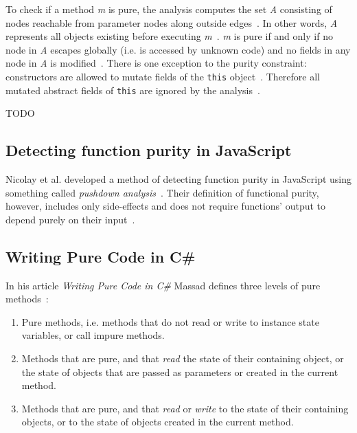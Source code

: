\documentclass[a4paper,12pt]{article}
\begin{document}
To check if a method \textit{m} is pure, the analysis computes the set \textit{A} consisting of nodes reachable from parameter nodes along outside edges~\cite{salcianu}. In other words, \textit{A} represents all objects existing before executing \textit{m}~\cite{salcianu}. \textit{m} is pure if and only if no node in \textit{A} escapes globally (i.e. is accessed by unknown code) and no fields in any node in \textit{A} is modified~\cite{salcianu}. There is one exception to the purity constraint: constructors are allowed to mutate fields of the \texttt{this} object~\cite{salcianu}. Therefore all mutated abstract fields of \texttt{this} are ignored by the analysis~\cite{salcianu}.

TODO

\subsection{Detecting function purity in JavaScript}
Nicolay et al. developed a method of detecting function purity in JavaScript using something called \textit{pushdown analysis}~\cite{purity-in-javascript}. Their definition of functional purity, however, includes only side-effects and does not require functions' output to depend purely on their input~\cite{purity-in-javascript}.


\subsection{Writing Pure Code in C\#} \label{sub:Writing Pure Code in Cs}
In his article \textit{Writing Pure Code in C\#} Massad defines three levels of pure methods~\cite{yacoub-massad-pure-code}:
\begin{enumerate}
  \item Pure methods, i.e. methods that do not read or write to instance state variables, or call impure methods.
  \item Methods that are pure, and that \textit{read} the state of their containing object, or the state of objects that are passed as parameters or created in the current method.
  \item Methods that are pure, and that \textit{read} or \textit{write} to the state of their containing objects, or to the state of objects created in the current method.
\end{enumerate}
\end{document}
